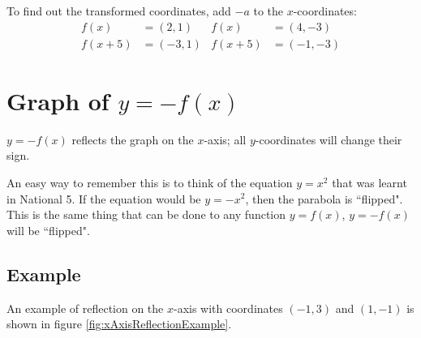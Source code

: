 To find out the transformed coordinates, add $-a$ to the $x$-coordinates:
\begin{align*}
f(x)&=(2,1) & f(x)&=(4,-3)\\
f(x+5)&=(-3,1) & f(x+5)&=(-1,-3)
\end{align*}


\section{Graph of $y=-f(x)$}
$y=-f(x)$ reflects the graph on the $x$-axis; all $y$-coordinates will change their sign.

An easy way to remember this is to think of the equation $y=x^2$ that was learnt in National 5. If the equation would be $y=-x^2$, then the parabola is ``flipped". This is the same thing that can be done to any function $y=f(x)$, $y=-f(x)$ will be ``flipped".

\subsection{Example}
An example of reflection on the $x$-axis with coordinates $(-1,3)$ and $(1,-1)$ is shown in figure \ref{fig:xAxisReflectionExample}.


